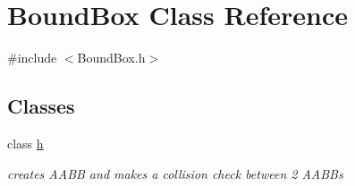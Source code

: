 \hypertarget{class_bound_box}{}\section{Bound\+Box Class Reference}
\label{class_bound_box}


{\ttfamily \#include $<$Bound\+Box.\+h$>$}

\subsection*{Classes}
\begin{DoxyCompactItemize}
\item 
class \hyperlink{class_bound_box_1_1h}{h}
\begin{DoxyCompactList}\small\item\em creates A\+A\+B\+B and makes a collision check between 2 A\+A\+B\+Bs \end{DoxyCompactList}\end{DoxyCompactItemize}
